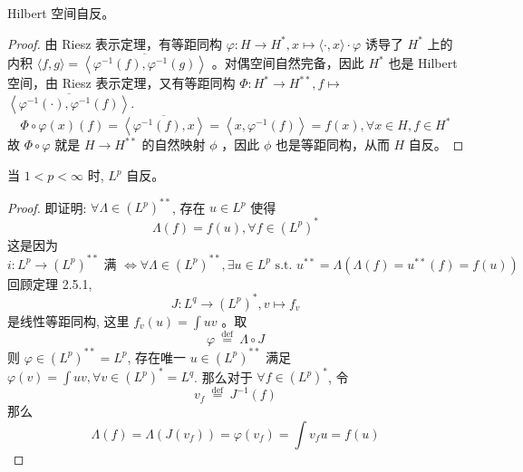 \documentclass[lang=cn,newtx,10pt,scheme=chinese,thmcnt=chapter]{elegantbook}
\begin{document}
\begin{example}
Hilbert 空间自反。
\end{example}
\begin{proof}
由 Riesz 表示定理，有等距同构 $\varphi: H \rightarrow H^*, x \mapsto\langle\cdot, x\rangle \cdot \varphi$ 诱导了 $H^*$ 上的内积 $\langle f, g\rangle=\overline{\left\langle\varphi^{-1}(f), \varphi^{-1}(g)\right\rangle}$ 。对偶空间自然完备，因此 $H^*$ 也是 Hilbert 空间，由 Riesz 表示定理，又有等距同构 $\Phi: H^* \rightarrow H^{* *}, f \mapsto$ $\overline{\left\langle\varphi^{-1}(\cdot), \varphi^{-1}(f)\right\rangle}$.
\begin{equation*}
\Phi \circ \varphi(x)(f)=\overline{\left\langle\varphi^{-1}(f), x\right\rangle}=\left\langle x, \varphi^{-1}(f)\right\rangle=f(x), \forall x \in H, f \in H^*
\end{equation*}
故 $\Phi \circ \varphi$ 就是 $H \rightarrow H^{* *}$ 的自然映射 $\phi$ ，因此 $\phi$ 也是等距同构，从而 $H$ 自反。
\end{proof}
\begin{theorem}
当 $1<p<\infty$ 时, $L^p$ 自反。

\end{theorem}
\begin{proof}
 即证明: $\forall \Lambda \in\left(L^p\right)^{* *}$, 存在 $u \in L^p$ 使得
\begin{equation*}
\Lambda(f)=f(u), \forall f \in\left(L^p\right)^*
\end{equation*}
这是因为
\begin{equation*}
i: L^p \rightarrow\left(L^p\right)^{* *} \text { 满 } \Leftrightarrow \forall \Lambda \in\left(L^p\right)^{* *}, \exists u \in L^p \text { s.t. } u^{* *}=\Lambda\left(\Lambda(f)=u^{* *}(f)=f(u)\right)
\end{equation*}
回顾定理 2.5.1,
\begin{equation*}
J: L^q \rightarrow\left(L^p\right)^*, v \mapsto f_v
\end{equation*}
是线性等距同构, 这里 $f_v(u)=\int u v$ 。取
\begin{equation*}
\varphi \stackrel{\text { def }}{=} \Lambda \circ J
\end{equation*}
则 $\varphi \in\left(L^p\right)^{**}=L^p$, 存在唯一 $u \in (L^p)^{**}$ 满足 $\varphi(v)=\int u v, \forall v \in (L^p)^*= L^q$. 那么对于 $\forall f \in\left(L^p\right)^*$, 令
\begin{equation*}
v_f \stackrel{\text { def }}{=} J^{-1}(f)
\end{equation*}
那么
\begin{equation*}
\Lambda(f)=\Lambda\left(J\left(v_f\right)\right)=\varphi\left(v_f\right)=\int v_f u=f(u)
\end{equation*}
\end{proof}
\end{document}
